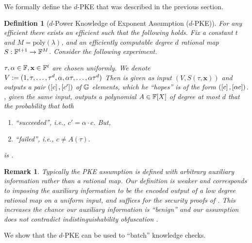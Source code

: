 \documentclass[11pt]{article}
\numberwithin{figure}{section} %
\newtheorem{dfn}[thm]{Definition}
\newtheorem{remark}[thm]{Remark}
\newcommand{\x}{\ensuremath{\mathbf{x}}\xspace}
\newcommand{\poly}{\ensuremath{\mathrm{poly}(\lambda)}\xspace}
\begin{document}
We formally define the $d$-PKE that was described in the previous section.
\begin{dfn}[$d$-Power Knowledge of Exponent Assumption ($d$-PKE)]\label{dfn:koeassumption}
For any efficient \adv there exists an efficient \ext such that the following holds.
Fix a constant $t$ and $M=\poly$, and an efficiently computable degree $d$ rational map $S:\mathbb F^{t+1}\to\mathbb F^M$.
 Consider the following experiment.

 $\tau,\alpha\in \F,\x\in\F^t$ are chosen uniformly. We denote $V:= (1,\tau,\ldots,\tau^{d},\alpha,\alpha \tau,\ldots,\alpha \tau^{d})$
 Then \adv is given as input $(V,S(\tau,\x))$
 and outputs a pair $(\left[c\right],\left[c'\right])$ of ${\mathbb G}$ elements, which he ``hopes'' is of the form $(\left[c\right],\left[\alpha c\right])$.
   \ext, given the same input, outputs a polynomial $A\in \mathbb F[X]$ of degree at most $d$ that the probability that both
   
 \begin{enumerate}
  \item \adv ``succeeded'', i.e., $c'=\alpha\cdot c$. But,
  \item \ext ``failed'', i.e., $c \neq A(\tau)$.
   \end{enumerate}
is \negl.
\end{dfn}
\begin{remark}\label{rem:benign}
Typically the PKE assumption is defined with arbitrary auxiliary information rather than a rational map.
Our definition is weaker and corresponds to imposing the auxiliary information to be the encoded output of a low degree rational map on a uniform input,
and suffices for the security proofs of \cite{GGPR,PHGR}.
This increases the chance our auxiliary information is ``benign'' and our assumption does not contradict indistinguishability obfuscation \cite{BCPR13}.
\end{remark}

We show that the $d$-PKE can be used to ``batch'' knowledge checks.
\end{document}
